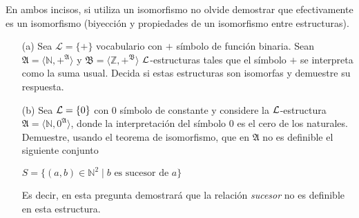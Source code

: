 En ambos incisos, si utiliza un isomorfismo no olvide demostrar que efectivamente es un isomorfismo (biyección y propiedades de un isomorfismo entre estructuras).
\begin{enumerate}
	\item[(a)] Sea $\mathcal{L}=\{+\}$ vocabulario con $+$ símbolo de función binaria. Sean $\mathfrak{A}=\langle\mathbb{N},+^\mathfrak{A}\rangle$ y $\mathfrak{B}=\langle\mathbb{Z},+^\mathfrak{B}\rangle$ $\mathcal{L}$-estructuras tales que el símbolo $+$ se interpreta como la suma usual. Decida si estas estructuras son isomorfas y demuestre su respuesta.
	\item[(b)] Sea $\mathcal{L}=\{0\}$ con $0$ símbolo de constante y considere la $\mathcal{L}$-estructura $\mathfrak{A}=\langle\mathbb{N},0^\mathfrak{A}\rangle$, donde la interpretación del símbolo $0$ es el cero de los naturales. Demuestre, usando el teorema de isomorfismo, que en $\mathfrak{A}$ no es definible el siguiente conjunto 
	\begin{center}
		$S=\{(a,b)\in\mathbb{N}^2\mid b\text{ es sucesor de }a\}$
	\end{center}
	Es decir, en esta pregunta demostrará que la relación \textit{sucesor} no es definible en esta estructura.

\end{enumerate}